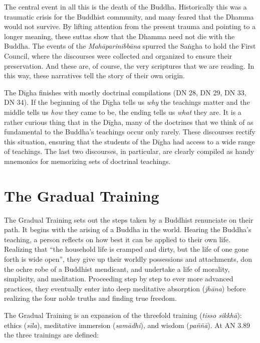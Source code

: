 \documentclass[12pt,openany]{book}%
\begin{document}
The central event in all this is the death of the Buddha. Historically this was a traumatic crisis for the Buddhist community, and many feared that the Dhamma would not survive. By lifting attention from the present trauma and pointing to a longer meaning, these suttas show that the Dhamma need not die with the Buddha. The events of the \textit{\textsanskrit{Mahāparinibbāna}} spurred the \textsanskrit{Saṅgha} to hold the First Council, where the discourses were collected and organized to ensure their preservation. And these are, of course, the very scriptures that we are reading. In this way, these narratives tell the story of their own origin.

The \textsanskrit{Dīgha} finishes with mostly doctrinal compilations (DN 28, DN 29, DN 33, DN 34). If the beginning of the \textsanskrit{Dīgha} tells us \emph{why} the teachings matter and the middle tells us \emph{how} they came to be, the ending tells us \emph{what} they are. It is a rather curious thing that in the \textsanskrit{Dīgha}, many of the doctrines that we think of as fundamental to the Buddha’s teachings occur only rarely. These discourses rectify this situation, ensuring that the students of the \textsanskrit{Dīgha} had access to a wide range of teachings. The last two discourses, in particular, are clearly compiled as handy mnemonics for memorizing sets of doctrinal teachings.

\section*{The Gradual Training}

The Gradual Training sets out the steps taken by a Buddhist renunciate on their path. It begins with the arising of a Buddha in the world. Hearing the Buddha’s teaching, a person reflects on how best it can be applied to their own life. Realizing that “the household life is cramped and dirty, but the life of one gone forth is wide open”, they give up their worldly possessions and attachments, don the ochre robe of a Buddhist mendicant, and undertake a life of morality, simplicity, and meditation. Proceeding step by step to ever more advanced practices, they eventually enter into deep meditative absorption (\textit{\textsanskrit{jhāna}}) before realizing the four noble truths and finding true freedom.

The Gradual Training is an expansion of the threefold training (\textit{tisso \textsanskrit{sikkhā}}): ethics (\textit{\textsanskrit{sīla}}), meditative immersion (\textit{\textsanskrit{samādhi}}), and wisdom (\textit{\textsanskrit{paññā}}). At AN 3.89 the three trainings are defined:
\end{document}
